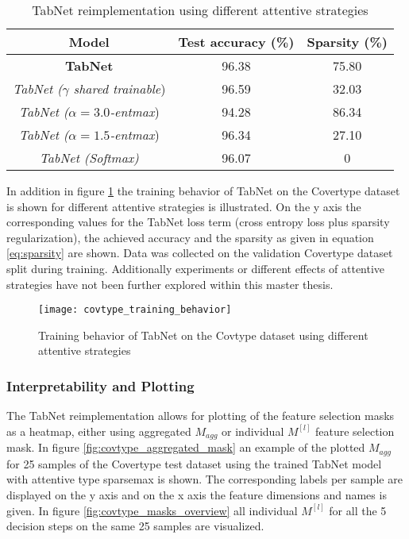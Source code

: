 \documentclass[../main.tex]{subfiles}
\begin{document}
\begin{table}[H]
    \centering
    \begin{tabular}{ |c|c|c| } 
        \hline
        \rowcolor{lightgray} \textbf{Model} & \textbf{Test accuracy (\%)} & \textbf{Sparsity} (\%) \\
        \hline
        \textbf{TabNet} &  96.38 & 75.80 \\
        \emph{TabNet ($\gamma$ shared trainable}) & 96.59 & 32.03 \\
        \emph{TabNet ($\alpha=3.0$-entmax}) &  94.28 & 86.34 \\
        \emph{TabNet ($\alpha=1.5$-entmax}) &  96.34 & 27.10 \\
        \emph{TabNet (Softmax)} &  96.07 & 0 \\        
     \hline
    \end{tabular}
    \caption{TabNet reimplementation using different attentive strategies}
 	\label{tbl:tabnet_attentive_strategies} 	
\end{table}

In addition in figure \ref{fig:covtype_training_behavior} the training behavior of TabNet on the Covertype dataset is shown for different attentive strategies is illustrated. On the y axis the corresponding values for the TabNet loss term (cross entropy loss plus sparsity regularization), the achieved accuracy and the sparsity as given in equation \ref{eq:sparsity} are shown. Data was collected on the validation Covertype dataset split during training. 
Additionally experiments or different effects of attentive strategies have not been further explored within this master thesis.

\begin{figure}[H]
    \centering
    \texttt{[image: covtype\_training\_behavior]}        
    \caption{Training behavior of TabNet on the Covtype dataset using different attentive strategies}
    \label{fig:covtype_training_behavior}
\end{figure}

\subsubsection{Interpretability and Plotting} \label{sssec:tabnet_implementation_interpretability}

The TabNet reimplementation allows for plotting of the feature selection masks as a heatmap, either using aggregated $M_{agg}$ or individual $M^{[l]}$ feature selection mask. In figure \ref{fig:covtype_aggregated_mask} an example of the plotted $M_{agg}$ for 25 samples of the Covertype test dataset using the trained TabNet model with attentive type sparsemax is shown. The corresponding labels per sample are displayed on the y axis and on the x axis the feature dimensions and names is given. In figure \ref{fig:covtype_masks_overview} all individual $M^{[l]}$ for all the 5 decision steps on the same 25 samples are visualized. 
\end{document}
